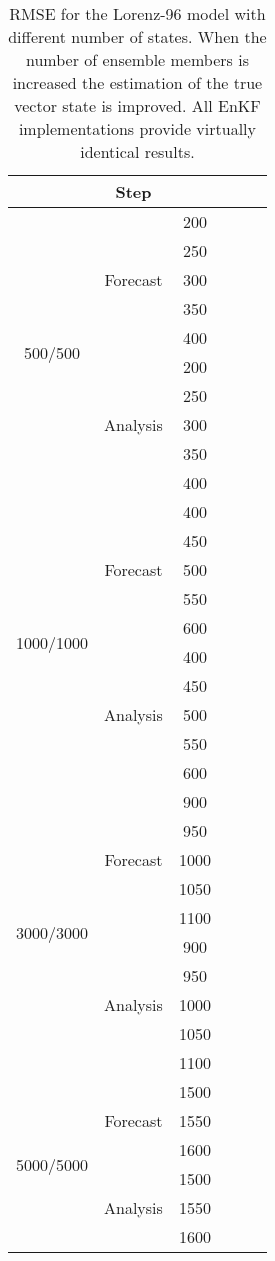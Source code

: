 \documentclass[12pt]{article}
\begin{document}
\begin{table}[H]
\centering
{\scriptsize
\begin{tabular}{|c|c|c|c|c|c|} \hline
 & {\bf Step} &  &  &  &   \\ \hline
\multirow{10}{*}{500/500} & \multirow{5}{*}{Forecast}  & 200 &  &  &   \\ 
&  & 250 &  &  &  \\ 
&  & 300 &  &  &   \\ 
&  & 350 &  &  &   \\ 
&  & 400 &  &  &  \\ \cline{2-6}
& \multirow{5}{*}{Analysis} &  200 &  &  &   \\ 
& & 250 &  &  &  \\ 
& & 300 &  &  &   \\ 
& & 350 &  &  &   \\ 
& & 400 &  &  &  \\ \hline
\multirow{10}{*}{1000/1000} & \multirow{5}{*}{Forecast}  & 400 &  &  &   \\ 
&  & 450 &  &  &  \\ 
&  & 500 &  &  &   \\ 
&  & 550 &  &  &   \\ 
&  & 600 &  &  &  \\ \cline{2-6}
& \multirow{5}{*}{Analysis} &  400 &  &  &   \\ 
& & 450 &  &  &  \\ 
& & 500 &  &  &   \\ 
& & 550 &  &  &   \\ 
& & 600 &  &  &  \\ \hline
\multirow{10}{*}{3000/3000} & \multirow{5}{*}{Forecast}  & 900 &  &  &   \\ 
&  & 950 &  &  &  \\ 
&  & 1000 &  &  &   \\ 
&  & 1050 &  &  &   \\ 
&  & 1100 &  &  &  \\ \cline{2-6}
& \multirow{5}{*}{Analysis} &  900 &  &  &   \\ 
& & 950 &  &  &  \\ 
& & 1000 &  &  &   \\ 
& & 1050 &  &  &   \\ 
& & 1100 &  &  &  \\ \hline
\multirow{6}{*}{5000/5000} & \multirow{3}{*}{Forecast}  & 1500 &  &  &   \\ 
&  & 1550 &  &  &  \\ 
&  & 1600 &  &  &  \\ \cline{2-6}
& \multirow{3}{*}{Analysis} &  1500 &  &  &   \\ 
& & 1550 &  &  &  \\ 
& & 1600 &  &  &  \\ \hline
\end{tabular}
}
\caption{RMSE for the Lorenz-96 model with different number of states. When the number of ensemble members is increased the estimation of the true vector state is improved. All EnKF implementations provide virtually identical results.}
\label{Tab:Lorenz-Results-RMS}
\end{table}
\end{document}
